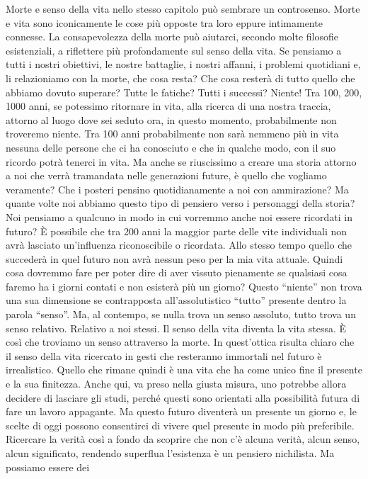 \documentclass[12pt]{book} %
\begin{document}
Morte e senso della vita nello stesso capitolo può sembrare un controsenso. Morte e vita sono iconicamente le cose più
opposte tra loro eppure intimamente connesse. La consapevolezza della morte può aiutarci, secondo molte filosofie esistenziali, a riflettere più profondamente sul senso della vita. Se pensiamo
a tutti i nostri obiettivi, le nostre battaglie, i nostri affanni, i problemi quotidiani e, li relazioniamo con la
morte, che cosa resta? Che cosa resterà di tutto quello che abbiamo dovuto superare? Tutte le fatiche? Tutti i
successi? Niente! Tra 100, 200, 1000 anni, se potessimo ritornare in vita, alla ricerca di una nostra traccia, attorno
al luogo dove sei seduto ora, in questo momento, probabilmente non troveremo niente.
Tra 100 anni probabilmente non sarà nemmeno più in vita nessuna delle persone che ci ha
conosciuto e che in qualche modo, con il suo ricordo potrà tenerci in vita. Ma anche se riuscissimo a creare una storia
attorno a noi che verrà tramandata nelle generazioni future, è quello che vogliamo veramente? Che i posteri pensino
quotidianamente a noi con ammirazione? Ma quante volte noi abbiamo questo tipo di pensiero verso i personaggi della
storia? Noi pensiamo a qualcuno in modo in cui vorremmo anche noi essere ricordati in futuro? È possibile che tra 200 anni la maggior parte delle vite individuali non avrà lasciato un’influenza riconoscibile o ricordata. Allo stesso tempo quello che succederà in quel futuro non avrà nessun peso
per la mia vita attuale. Quindi cosa dovremmo fare per poter dire di aver vissuto pienamente se qualsiasi cosa faremo
ha i giorni contati e non esisterà più un giorno? Questo “niente” non trova una sua dimensione se contrapposta
all'assolutistico “tutto” presente dentro la parola “senso”. Ma, al contempo, se nulla trova un
senso assoluto, tutto trova un senso relativo. Relativo a noi stessi. Il senso della vita diventa la vita stessa. 
È così che troviamo un senso attraverso la morte. In quest'ottica risulta chiaro che il senso della
vita ricercato in gesti che resteranno immortali nel futuro è irrealistico. Quello che rimane quindi è una vita che ha
come unico fine il presente e la sua finitezza. Anche qui, va preso nella giusta misura, uno potrebbe allora decidere
di lasciare gli studi, perché questi sono orientati alla possibilità futura di fare un lavoro appagante. Ma questo
futuro diventerà un presente un giorno e, le scelte di oggi possono consentirci di vivere quel presente in modo più
preferibile. Ricercare la verità così a fondo da scoprire che non c'è alcuna verità, alcun senso, alcun
significato, rendendo superflua l'esistenza è un pensiero nichilista. Ma possiamo essere dei
\end{document}
